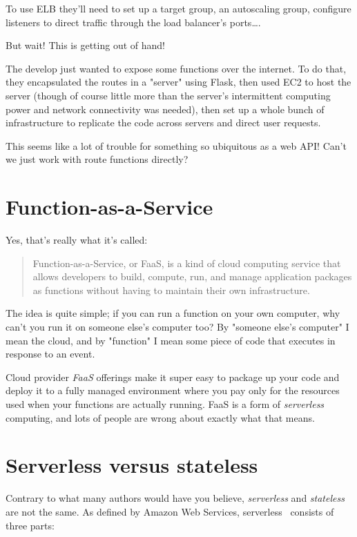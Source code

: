 \documentclass{article}
\newcommand{\noterm}[1]{\textit{#1}}
\newcommand{\term}[1]{\noterm{#1}\index{#1}}
\begin{document}
To use ELB they'll need to set up a target group, an autoscaling group, configure listeners to direct traffic through the load balancer's ports\ldots.

But wait!
This is getting out of hand!

The develop just wanted to expose some functions over the internet.
To do that, they encapsulated the routes in a "server" using Flask, then used EC2 to host the server (though of course little more than the server's intermittent computing power and network connectivity was needed), then set up a whole bunch of infrastructure to replicate the code across servers and direct user requests.

This seems like a lot of trouble for something so ubiquitous as a web API!
Can't we just work with route functions directly?

\section{Function-as-a-Service}

Yes, that's really what it's called:

\begin{quote}
  Function-as-a-Service, or FaaS, is a kind of cloud computing service that allows developers to build, compute, run, and manage application packages as functions without having to maintain their own infrastructure.~\cite{redhat-faas}
\end{quote}

The idea is quite simple; if you can run a function on your own computer, why can't you run it on someone else's computer too?
By "someone else's computer" I mean the cloud, and by "function" I mean some piece of code that executes in response to an event.

Cloud provider \term{FaaS} offerings make it super easy to package up your code and deploy it to a fully managed environment where you pay only for the resources used when your functions are actually running.
FaaS is a form of \term{serverless} computing, and lots of people are wrong about exactly what that means.

\section{Serverless versus stateless}

Contrary to what many authors would have you believe, \term{serverless} and \term{stateless} are not the same.
As defined by Amazon Web Services, serverless~\cite{serverless} consists of three parts:
\end{document}
